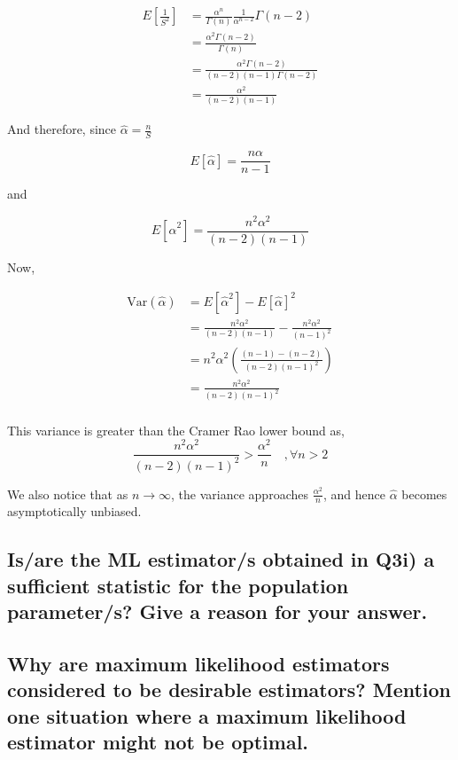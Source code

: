 \documentclass[]{article}
\begin{document}
\begin{align*}
	E \left[\frac{1}{S^2}\right] &= \frac{\alpha^n}{\Gamma (n)} \frac{1}{\alpha^{n-2}} \Gamma(n-2)\\
	&=  \frac{\alpha^2\Gamma (n-2)}{\Gamma (n)}\\
	&=  \frac{\alpha^2\Gamma (n-2)}{(n-2)(n-1)\Gamma (n-2)}\\
	&=  \frac{\alpha^2}{(n-2)(n-1)}
\end{align*}



\noindent And therefore, since $\hat{\alpha} = \frac{n}{S}$

$$
E[\hat{\alpha}] = \frac{n\alpha}{n-1}
$$

\noindent and

$$
E[\hat{\alpha}^2] = \frac{n^2\alpha^2}{(n-2)(n-1)}
$$

\noindent Now,

\begin{align*}
	\text{Var}(\hat{\alpha}) &= E[\hat{\alpha}^2] - E[\hat{\alpha}]^2\\
						&= \frac{n^2\alpha^2}{(n-2)(n-1)} - \frac{n^2\alpha^2}{(n-1)^2}\\
						&= n^2\alpha^2 \left( \frac{(n-1)-(n-2)}{(n-2)(n-1)^2}\right)\\
						&= \frac{n^2\alpha^2}{(n-2)(n-1)^2}\\
\end{align*}


\noindent This variance is greater than the Cramer Rao lower bound as,
$$
\frac{n^2\alpha^2}{(n-2)(n-1)^2}  > \frac{\alpha^2}{n} \quad ,\forall n>2
$$

\noindent We also notice that as $n \rightarrow \infty$, the variance approaches $\frac{\alpha^2}{n}$, and hence $\hat{\alpha}$ becomes asymptotically unbiased.




\subsection{Is/are the ML estimator/s obtained in Q3i) a sufficient statistic for the population parameter/s?  Give a reason for your answer.}

\subsection{Why are maximum likelihood estimators considered to be desirable estimators?  Mention one situation where a maximum likelihood estimator might not be optimal.   }
\end{document}
